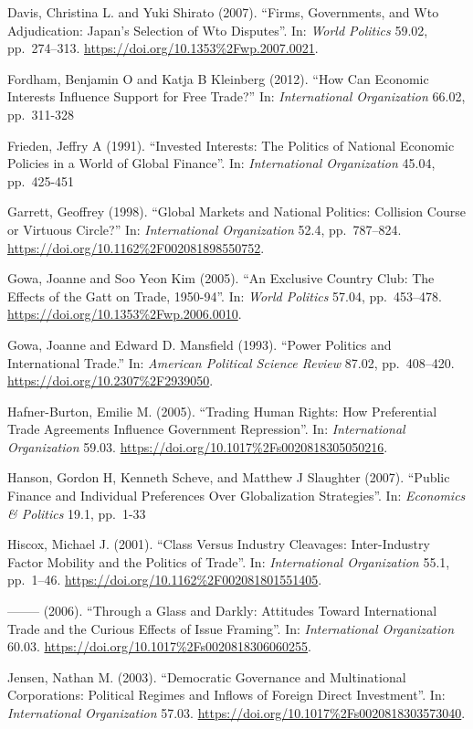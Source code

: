 \documentclass[10pt,]{article}
\begin{document}
Davis, Christina L. and Yuki Shirato (2007). ``Firms, Governments, and
Wto Adjudication: Japan's Selection of Wto Disputes''. In:
\emph{World Politics} 59.02, pp.~274--313.
\url{https://doi.org/10.1353\%2Fwp.2007.0021}.

Fordham, Benjamin O and Katja B Kleinberg (2012). ``How Can Economic
Interests Influence Support for Free Trade?'' In:
\emph{International Organization} 66.02, pp.~311-328

Frieden, Jeffry A (1991). ``Invested Interests: The Politics of National
Economic Policies in a World of Global Finance''. In:
\emph{International Organization} 45.04, pp.~425-451

Garrett, Geoffrey (1998). ``Global Markets and National Politics:
Collision Course or Virtuous Circle?'' In:
\emph{International Organization} 52.4, pp.~787--824.
\url{https://doi.org/10.1162\%2F002081898550752}.

Gowa, Joanne and Soo Yeon Kim (2005). ``An Exclusive Country Club: The
Effects of the Gatt on Trade, 1950-94''. In: \emph{World Politics}
57.04, pp.~453--478. \url{https://doi.org/10.1353\%2Fwp.2006.0010}.

Gowa, Joanne and Edward D. Mansfield (1993). ``Power Politics and
International Trade.'' In: \emph{American Political Science Review}
87.02, pp.~408--420. \url{https://doi.org/10.2307\%2F2939050}.

Hafner-Burton, Emilie M. (2005). ``Trading Human Rights: How
Preferential Trade Agreements Influence Government Repression''. In:
\emph{International Organization} 59.03.
\url{https://doi.org/10.1017\%2Fs0020818305050216}.

Hanson, Gordon H, Kenneth Scheve, and Matthew J Slaughter (2007).
``Public Finance and Individual Preferences Over Globalization
Strategies''. In: \emph{Economics \& Politics} 19.1, pp.~1-33

Hiscox, Michael J. (2001). ``Class Versus Industry Cleavages:
Inter-Industry Factor Mobility and the Politics of Trade''. In:
\emph{International Organization} 55.1, pp.~1--46.
\url{https://doi.org/10.1162\%2F002081801551405}.

-------- (2006). ``Through a Glass and Darkly: Attitudes Toward
International Trade and the Curious Effects of Issue Framing''. In:
\emph{International Organization} 60.03.
\url{https://doi.org/10.1017\%2Fs0020818306060255}.

Jensen, Nathan M. (2003). ``Democratic Governance and Multinational
Corporations: Political Regimes and Inflows of Foreign Direct
Investment''. In: \emph{International Organization} 57.03.
\url{https://doi.org/10.1017\%2Fs0020818303573040}.
\end{document}
